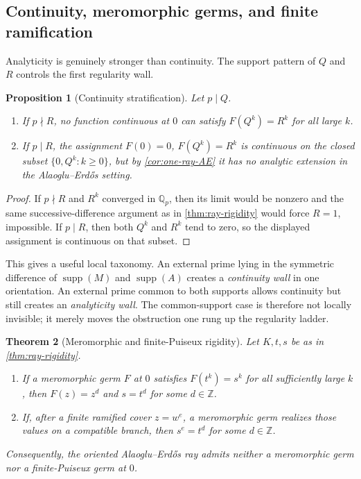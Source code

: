 \documentclass[11pt,oneside]{article}
\newtheorem{theorem}{Theorem}[section]
\newtheorem{proposition}[theorem]{Proposition}
\theoremstyle{definition}
\newcommand{\Z}{\mathbb Z}
\newcommand{\Qp}{\mathbb Q_p}
\newcommand{\supp}{\operatorname{supp}}
\newcommand{\AEconj}{Alaoglu--Erd\H{o}s}
\begin{document}
\subsection{Continuity, meromorphic germs, and finite ramification}

Analyticity is genuinely stronger than continuity.  The support pattern of $Q$ and $R$
controls the first regularity wall.

\begin{proposition}[Continuity stratification]\label{prop:continuity}
Let $p\mid Q$.
\begin{enumerate}[label=(\roman*)]
\item If $p\nmid R$, no function continuous at $0$ can satisfy $F(Q^k)=R^k$ for all large
  $k$.
\item If $p\mid R$, the assignment $F(0)=0$, $F(Q^k)=R^k$ is continuous on the closed subset
  $\{0,Q^k:k\ge0\}$, but by \cref{cor:one-ray-AE} it has no analytic extension in the
  \AEconj{} setting.
\end{enumerate}
\end{proposition}

\begin{proof}
If $p\nmid R$ and $R^k$ converged in $\Qp$, then its limit would be nonzero and the same
successive-difference argument as in \cref{thm:ray-rigidity} would force $R=1$, impossible.
If $p\mid R$, then both $Q^k$ and $R^k$ tend to zero, so the displayed assignment is
continuous on that subset.
\end{proof}

This gives a useful local taxonomy.  An external prime lying in the symmetric difference of
$\supp(M)$ and $\supp(A)$ creates a \emph{continuity wall} in one orientation.  An external
prime common to both supports allows continuity but still creates an \emph{analyticity wall}.
The common-support case is therefore not locally invisible; it merely moves the obstruction
one rung up the regularity ladder.

\begin{theorem}[Meromorphic and finite-Puiseux rigidity]\label{thm:puiseux}
Let $K,t,s$ be as in \cref{thm:ray-rigidity}.
\begin{enumerate}[label=(\roman*)]
\item If a meromorphic germ $F$ at $0$ satisfies $F(t^k)=s^k$ for all sufficiently large
  $k$, then $F(z)=z^d$ and $s=t^d$ for some $d\in\Z$.
\item If, after a finite ramified cover $z=w^e$, a meromorphic germ realizes those values on
  a compatible branch, then $s^e=t^d$ for some $d\in\Z$.
\end{enumerate}
Consequently, the oriented \AEconj{} ray admits neither a meromorphic germ nor a finite-Puiseux
germ at $0$.
\end{theorem}
\end{document}

